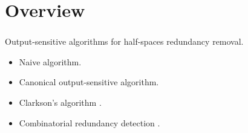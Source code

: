 \section{Overview}
\begin{frame}\frametitle{\insertsection}\justifying
Output-sensitive algorithms for half-spaces redundancy removal.\pause

\begin{itemize}[label={\color{prussianblue}$\bullet$},itemsep=6pt]
\item Naive algorithm.\pause
\item Canonical output-sensitive algorithm.\pause
\item Clarkson's algorithm \cite{clarkson:1994}.\pause
\item Combinatorial redundancy detection \cite{fukuda:2014}.
\end{itemize}
\end{frame}
